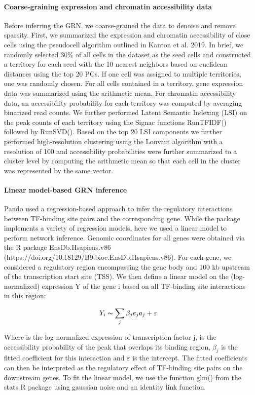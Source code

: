 \paragraph{Coarse-graining expression and chromatin accessibility data}
Before inferring the GRN, we coarse-grained the data to denoise and remove sparsity. First, we summarized the expression and chromatin accessibility of close cells using the pseudocell algorithm outlined in Kanton et al. 2019. In brief, we randomly selected 30\% of all cells in the dataset as the seed cells and constructed a territory for each seed with the 10 nearest neighbors based on euclidean distances using the top 20 PCs. If one cell was assigned to multiple territories, one was randomly chosen. For all cells contained in a territory, gene expression data was summarized using the arithmetic mean. For chromatin accessibility data, an accessibility probability for each territory was computed by averaging binarized read counts. We further performed Latent Semantic Indexing (LSI) on the peak counts of each territory using the Signac functions RunTFIDF() followed by RunSVD(). Based on the top 20 LSI components we further performed high-resolution clustering using the Louvain algorithm with a resolution of 100 and accessibility probabilities were further summarized to a cluster level by computing the arithmetic mean so that each cell in the cluster was represented by the same vector.
 
\paragraph{Linear model-based GRN inference}
Pando used a regression-based approach to infer the regulatory interactions between TF-binding site pairs and the corresponding gene. While the package implements a variety of regression models, here we used a linear model to perform network inference. Genomic coordinates for all genes were obtained via the R package EnsDb.Hsapiens.v86 (https://doi.org/10.18129/B9.bioc.EnsDb.Hsapiens.v86).  For each gene, we considered a regulatory region encompassing the gene body and 100 kb upstream of the transcription start site (TSS). We then define a linear model on the (log-normalized) expression Y of the gene i based on all TF-binding site interactions in this region:

\[ Y_i \thicksim \sum_j \beta_j e_j a_j + \varepsilon \]                       
 
Where is the log-normalized expression of transcription factor j, is the accessibility probability of the peak that overlaps its binding region, $\beta_j$ is the fitted coefficient for this interaction and $\varepsilon$ is the intercept. The fitted coefficients can then be interpreted as the regulatory effect of TF-binding site pairs on the downstream genes. To fit the linear model, we use the function glm() from the stats R package using gaussian noise and an identity link function.
 
